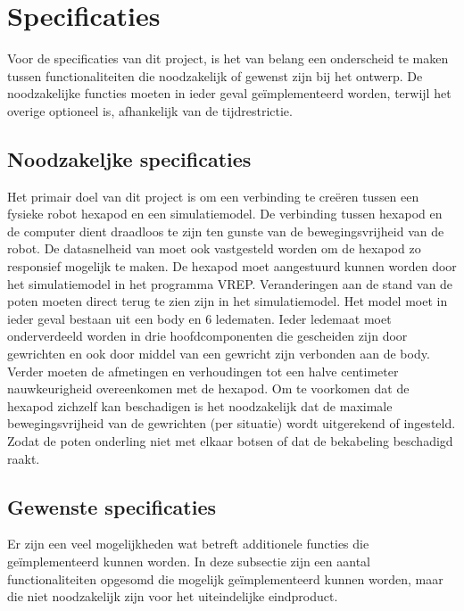 \documentclass[10pt,a4paper]{article}
\begin{document}
\section{Specificaties}

Voor de specificaties van dit project, is het van belang een onderscheid te maken tussen functionaliteiten die noodzakelijk of gewenst zijn bij het ontwerp. De noodzakelijke functies moeten in ieder geval ge\"implementeerd worden, terwijl het overige optioneel is, afhankelijk van de tijdrestrictie.

\subsection{Noodzakeljke specificaties}
Het primair doel van dit project is om een verbinding te cre\"eren tussen een fysieke robot hexapod en een simulatiemodel. De verbinding tussen hexapod en de computer dient draadloos te zijn ten gunste van de bewegingsvrijheid van de robot. De datasnelheid van moet ook vastgesteld worden om de hexapod zo responsief mogelijk te maken. De hexapod moet aangestuurd kunnen worden door het simulatiemodel in het programma VREP. Veranderingen aan de stand van de poten moeten direct terug te zien zijn in het simulatiemodel. Het model moet in ieder geval bestaan uit een body en 6 ledematen. Ieder ledemaat moet onderverdeeld worden in drie hoofdcomponenten die gescheiden zijn door gewrichten en ook door middel van een gewricht zijn verbonden aan de body. Verder moeten de afmetingen en verhoudingen tot een halve centimeter nauwkeurigheid overeenkomen met de hexapod.
Om te voorkomen dat de hexapod zichzelf kan beschadigen is het noodzakelijk dat de maximale bewegingsvrijheid van de gewrichten (per situatie) wordt uitgerekend of ingesteld. Zodat de poten onderling niet met elkaar botsen of dat de bekabeling beschadigd raakt.

\subsection{Gewenste specificaties}
Er zijn een veel mogelijkheden wat betreft additionele functies die ge\"implementeerd kunnen worden. In deze subsectie zijn een aantal functionaliteiten opgesomd die mogelijk ge\"implementeerd kunnen worden, maar die niet noodzakelijk zijn voor het uiteindelijke eindproduct.
\end{document}
